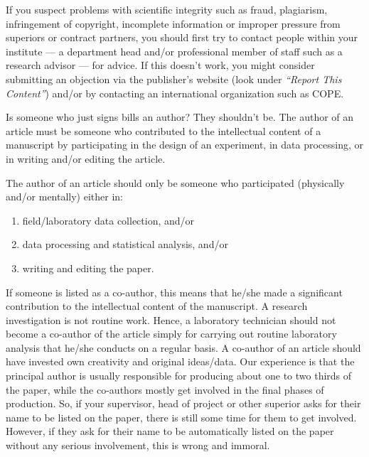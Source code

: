 \documentclass[graybox,envcountchap,sectrefs,UStrade]{svmono}
\begin{document}
If you suspect problems with scientific integrity such as fraud, plagiarism, infringement of copyright, incomplete information or improper pressure from superiors or contract partners, you should first try to contact people within your institute --- a department head and/or professional member of staff such as a research advisor --- for advice. If this doesn't work, you might consider submitting an objection via the publisher's website (look under \emph{``Report This Content''}) and/or by contacting an international organization such as COPE. \par

\begin{svgraybox}
Is someone who just signs bills an author? They shouldn't be. The author of an article must be someone who contributed to the intellectual content of a manuscript by participating in the design of an experiment, in data processing, or in writing and/or editing the article.
\end{svgraybox}\label{R:authors}

The author of an article should only be someone who participated (physically and/or mentally) either in:
\begin{enumerate}
 \item field/laboratory data collection, and/or
 \item data processing and statistical analysis, and/or
 \item writing and editing the paper.
\end{enumerate}

If someone is listed as a co-author, this means that he/she made a significant contribution to the intellectual content of the manuscript. A research investigation is not routine work. Hence, a laboratory technician should not become a co-author of the article simply for carrying out routine laboratory analysis that he/she conducts on a regular basis. A co-author of an article should have invested own creativity and original ideas/data. Our experience is that the principal author is usually responsible for producing about one to two thirds of the paper, while the co-authors mostly get involved in the final phases of production. So, if your supervisor, head of project or other superior asks for their name to be listed on the paper, there is still some time for them to get involved. However, if they ask for their name to be automatically listed on the paper without any serious involvement, this is wrong and immoral.\par
\end{document}
